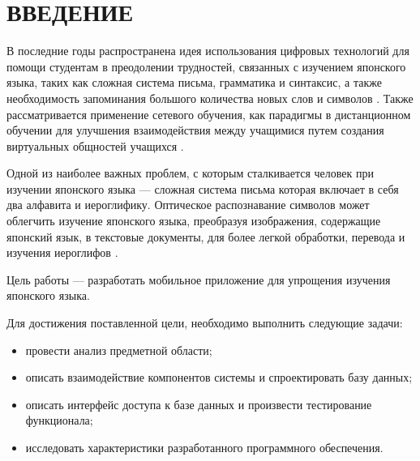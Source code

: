 \chapter*{ВВЕДЕНИЕ}

В последние годы распространена идея использования цифровых
технологий для помощи студентам в преодолении трудностей,
связанных с изучением японского языка, таких как сложная система
письма, грамматика и синтаксис, а также необходимость запоминания
большого количества новых слов и символов \cite{muhtarova}.
Также рассматривается применение сетевого обучения, как парадигмы в
дистанционном обучении для улучшения взаимодействия между
учащимися путем создания виртуальных общностей учащихся \cite{edu-network}.

Одной из наиболее важных проблем, с которым сталкивается человек
при изучении японского языка --- сложная система письма которая
включает в себя два алфавита и иероглифику. Оптическое распознавание
символов может облегчить изучение японского языка, преобразуя
изображения, содержащие японский язык, в текстовые документы,
для более легкой обработки, перевода и изучения иероглифов \cite{ocr-usage}.

Цель работы --- разработать мобильное приложение для упрощения
изучения японского языка.

Для достижения поставленной цели, необходимо выполнить следующие
задачи:

\begin{itemize}[label={$-$}]
  \item провести анализ предметной области;
  \item описать взаимодействие компонентов системы и спроектировать базу данных;
  \item описать интерфейс доступа к базе данных и произвести тестирование функционала;
  \item исследовать характеристики разработанного программного обеспечения.
\end{itemize}

